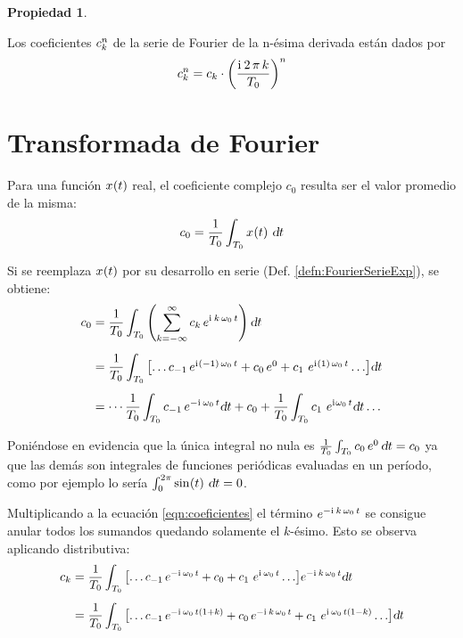 \documentclass[a5paper,12pt,twoside]{book}
\newtheorem{prop}{{Propiedad}}[chapter]
\begin{document}
\begin{mdframed}[style=MyFrame1]
    \begin{prop}
    \end{prop}
    Los coeficientes $c_\kth^\nth$ de la serie de Fourier de la n-ésima derivada están dados por
    \begin{equation*}
        c_\kth^\nth = c_\kth \cdot \bb{\frac{\iu \, 2 \, \pi \, \kth}{T_0}}^\nth
    \end{equation*}
\end{mdframed}


\section{Transformada de Fourier}

Para una función $\fx[x]{t}$ real, el coeficiente complejo $c_0$ resulta ser el valor promedio de la misma:
\begin{equation*}
    c_0 = \frac{1}{T_0} \int_{T_0} \fx[x]{t} \, \dif t
\end{equation*}

Si se reemplaza $\fx[x]{t}$ por su desarrollo en serie (Def. \ref{defn:FourierSerieExp}), se obtiene:
\begin{align}
    c_0 &= \frac{1}{T_0} \int_{T_0} \bb{\sum_{\kth=-\infty}^\infty c_\kth \, e^{\iu \, \kth \, \omega_0 \, t}} \dif t
    \notag
    \\[1ex]
    &= \frac{1}{T_0} \int_{T_0} \sqb{\dots c_{-1} \, e^{\iu \bb{-1} \, \omega_0 \, t} + c_0 \, e^0 + c_1 \, \, e^{\iu \bb{1} \, \omega_0 \, t} \dots} \dif t
    \label{eqn:coeficientes}
    \\[1ex]
    &= \cdots \frac{1}{T_0} \int_{T_0} c_{-1} \, e^{- \iu \, \omega_0 \, t} \dif t
    + c_0
    + \frac{1}{T_0} \int_{T_0} c_1 \, \, e^{\iu \omega_0 \, t} \dif t \dots
    \notag
\end{align}

Poniéndose en evidencia que la única integral no nula es $\frac{1}{T_0} \int_{T_0} c_0 \, e^0 \, \dif t = c_0$ ya que las demás son integrales de funciones periódicas evaluadas en un período, como por ejemplo lo sería $\int_0^{2\pi} \fx[\sin]{t} \, \dif t = 0$.

Multiplicando a la ecuación \ref{eqn:coeficientes} el término $e^{-\iu \, \kth \, \omega_0 \, t}$ se consigue anular todos los sumandos quedando solamente el $k$-ésimo. Esto se observa aplicando distributiva:
\begin{align*}
    c_\kth &=
    \scale{0.95}{
    \frac{1}{T_0} \int_{T_0} \sqb{\dots c_{-1} \, e^{-\iu \, \omega_0 \, t} + c_0 + c_1 \, \, e^{\iu \, \omega_0 \, t} \dots} e^{-\iu \, \kth \, \omega_0 \, t} \dif t
    }
    \\[1ex]
    &= 
    \scale{0.95}{
    \frac{1}{T_0} \int_{T_0} \sqb{\dots c_{-1} \, e^{-\iu \, \omega_0 \, t \bb{1 + k}} + c_0 \, e^{-\iu \, \kth \, \omega_0 \, t} + c_1 \, \, e^{\iu \, \omega_0 \, t \bb{1 - k}} \dots} \dif t
    }
\end{align*}
\end{document}
